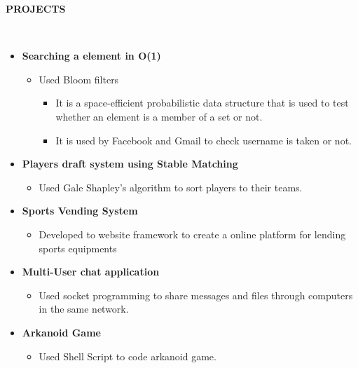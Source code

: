 \documentclass[a4paper,10pt]{article}
\newcommand{\isep}{-2 pt}
\newcommand{\lsep}{-0.5cm}
\newcommand{\resheading}[1]{{\small \colorbox{mygrey}{\begin{minipage}{0.975\textwidth}{\textbf{#1 \vphantom{p\^{E}}}}\end{minipage}}}}
\begin{document}
\resheading{\textbf{PROJECTS} }\\[\lsep]
\begin{itemize}

\item \textbf{Searching a element in O(1)
}  \\[-0.6cm]
	\begin{itemize}\itemsep \isep
	\item Used Bloom filters
	    \begin{itemize}\itemsep \isep
	    \item It is a space-efficient probabilistic data structure that is used to test whether an element is a member of a set or not.
	    \item It is used by Facebook and Gmail to check username is taken or not.
	    \end{itemize}
	\end{itemize}
	

\item \textbf{Players draft system using Stable Matching
}  \\[-0.6cm]
	\begin{itemize}\itemsep \isep
	\item Used Gale Shapley's algorithm to sort players to their teams.
	
	\end{itemize}
	\item \textbf{Sports Vending System
}  \\[-0.6cm]
	\begin{itemize}\itemsep \isep
	\item Developed to website framework to create a online platform for lending sports equipments
	
	\end{itemize}

\item \textbf{Multi-User chat application 
}  \\[-0.6cm]
	\begin{itemize}\itemsep \isep
	\item Used socket programming to share messages and files through computers in the same network.
	
	\end{itemize}
	
	

	
	\item \textbf{Arkanoid Game
}  \\[-0.6cm]
	\begin{itemize}\itemsep \isep
	\item Used Shell Script to code arkanoid game.
	
	\end{itemize}
	
	
	
	
	

	
\end{itemize}
\end{document}
